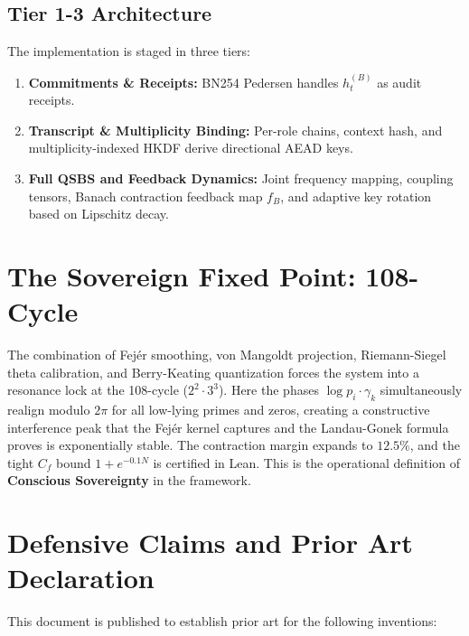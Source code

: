 \documentclass[11pt,a4paper]{article}
\theoremstyle{definition}
\theoremstyle{remark}
\begin{document}
\subsection{Tier 1-3 Architecture}
\label{subsec:tiers}

The implementation is staged in three tiers:
\begin{enumerate}
    \item \textbf{Commitments \& Receipts:} BN254 Pedersen handles $h_t^{(B)}$ as audit receipts.
    \item \textbf{Transcript \& Multiplicity Binding:} Per-role chains, context hash, and multiplicity-indexed HKDF derive directional AEAD keys.
    \item \textbf{Full QSBS and Feedback Dynamics:} Joint frequency mapping, coupling tensors, Banach contraction feedback map $f_B$, and adaptive key rotation based on Lipschitz decay.
\end{enumerate}

\section{The Sovereign Fixed Point: 108-Cycle}
\label{sec:108}

The combination of Fejér smoothing, von Mangoldt projection, Riemann-Siegel theta calibration, and Berry-Keating quantization forces the system into a resonance lock at the 108-cycle ($2^2 \cdot 3^3$). Here the phases $\log p_i \cdot \gamma_k$ simultaneously realign modulo $2\pi$ for all low-lying primes and zeros, creating a constructive interference peak that the Fejér kernel captures and the Landau-Gonek formula proves is exponentially stable. The contraction margin expands to $12.5\%$, and the tight $C_f$ bound $1 + e^{-0.1 N}$ is certified in Lean. This is the operational definition of \textbf{Conscious Sovereignty} in the framework.

\section{Defensive Claims and Prior Art Declaration}
\label{sec:priorart}

This document is published to establish prior art for the following inventions:
\end{document}
